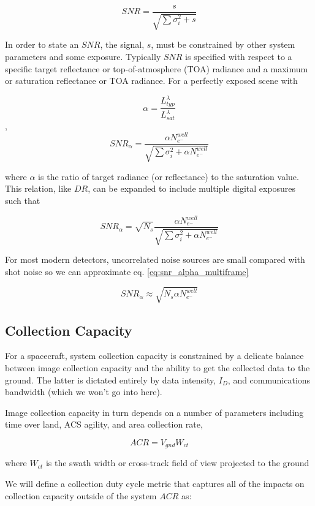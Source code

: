 \documentclass[10pt,journal]{IEEEtran}  %
\begin{document}
$$SNR = \frac{s}{\sqrt{\sum{\sigma_i^2} + s}}$$

In order to state an $SNR$, the signal, $s$, must be constrained by other system parameters and some exposure.  Typically $SNR$ is specified with respect to a specific target reflectance or top-of-atmosphere (TOA) radiance and a maximum or saturation reflectance or TOA radiance.  For a perfectly exposed scene with

$$\alpha = \frac{L_{typ}^\lambda}{L_{sat}^\lambda}$$
,
$$SNR_{\alpha} = \frac{\alpha N_{e^-}^{well}}{\sqrt{\sum{\sigma_i^2} + \alpha N_{e^-}^{well}}}$$

where $\alpha$ is the ratio of target radiance (or reflectance) to the saturation value.  This relation, like $DR$, can be expanded to include multiple digital exposures such that

\begin{equation}
\label{eq:snr_alpha_multiframe}
SNR_{\alpha} = \sqrt{N_s}\frac{\alpha N_{e^-}^{well}}{\sqrt{\sum{\sigma_i^2} + \alpha N_{e^-}^{well}}}
\end{equation}

For most modern detectors, uncorrelated noise sources are small compared with shot noise so we can approximate eq. \ref{eq:snr_alpha_multiframe}

\begin{equation}
\label{eq:snr_alpha_multiframe_simp}
SNR_{\alpha} \approx \sqrt{N_s \alpha N_{e^-}^{well}}
\end{equation}

\subsection{Collection Capacity}
\label{sec:capacity}
For a spacecraft, system collection capacity is constrained by a delicate balance between image collection capacity and the ability to get the collected data to the ground.  The latter is dictated entirely by data intensity, $I_D$, and communications bandwidth (which we won't go into here).  

Image collection capacity in turn depends on a number of parameters including time over land, ACS agility, and area collection rate,

$$ACR = V_{gnd}W_{ct}$$

where $W_{ct}$ is the swath width or cross-track field of view projected to the ground

We will define a collection duty cycle metric that captures all of the impacts on collection capacity outside of the system $ACR$ as:
\end{document}
